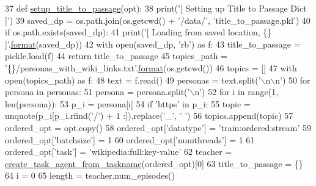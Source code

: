 \begin{DoxyCode}
37 \textcolor{keyword}{def }\hyperlink{namespaceparlai_1_1mturk_1_1tasks_1_1wizard__of__wikipedia_1_1run_a59836c3be93d4b491fa9ddecbb4e83c0}{setup\_title\_to\_passage}(opt):
38     print(\textcolor{stringliteral}{'[ Setting up Title to Passage Dict ]'})
39     saved\_dp = os.path.join(os.getcwd() + \textcolor{stringliteral}{'/data/'}, \textcolor{stringliteral}{'title\_to\_passage.pkl'})
40     \textcolor{keywordflow}{if} os.path.exists(saved\_dp):
41         print(\textcolor{stringliteral}{'[ Loading from saved location, \{\} ]'}.\hyperlink{namespaceparlai_1_1chat__service_1_1services_1_1messenger_1_1shared__utils_a32e2e2022b824fbaf80c747160b52a76}{format}(saved\_dp))
42         with open(saved\_dp, \textcolor{stringliteral}{'rb'}) \textcolor{keyword}{as} f:
43             title\_to\_passage = pickle.load(f)
44             \textcolor{keywordflow}{return} title\_to\_passage
45     topics\_path = \textcolor{stringliteral}{'\{\}/personas\_with\_wiki\_links.txt'}.\hyperlink{namespaceparlai_1_1chat__service_1_1services_1_1messenger_1_1shared__utils_a32e2e2022b824fbaf80c747160b52a76}{format}(os.getcwd())
46     topics = []
47     with open(topics\_path) \textcolor{keyword}{as} f:
48         text = f.read()
49         personas = text.split(\textcolor{stringliteral}{'\(\backslash\)n\(\backslash\)n'})
50         \textcolor{keywordflow}{for} persona \textcolor{keywordflow}{in} personas:
51             persona = persona.split(\textcolor{stringliteral}{'\(\backslash\)n'})
52             \textcolor{keywordflow}{for} i \textcolor{keywordflow}{in} range(1, len(persona)):
53                 p\_i = persona[i]
54                 \textcolor{keywordflow}{if} \textcolor{stringliteral}{'https'} \textcolor{keywordflow}{in} p\_i:
55                     topic = unquote(p\_i[p\_i.rfind(\textcolor{stringliteral}{'/'}) + 1 :]).replace(\textcolor{stringliteral}{'\_'}, \textcolor{stringliteral}{' '})
56                     topics.append(topic)
57     ordered\_opt = opt.copy()
58     ordered\_opt[\textcolor{stringliteral}{'datatype'}] = \textcolor{stringliteral}{'train:ordered:stream'}
59     ordered\_opt[\textcolor{stringliteral}{'batchsize'}] = 1
60     ordered\_opt[\textcolor{stringliteral}{'numthreads'}] = 1
61     ordered\_opt[\textcolor{stringliteral}{'task'}] = \textcolor{stringliteral}{'wikipedia:full:key-value'}
62     teacher = \hyperlink{namespaceparlai_1_1core_1_1agents_ab4473fa54af02b5ab385b41b51dacd10}{create\_task\_agent\_from\_taskname}(ordered\_opt)[0]
63     title\_to\_passage = \{\}
64     i = 0
65     length = teacher.num\_episodes()

\end{DoxyCode}
